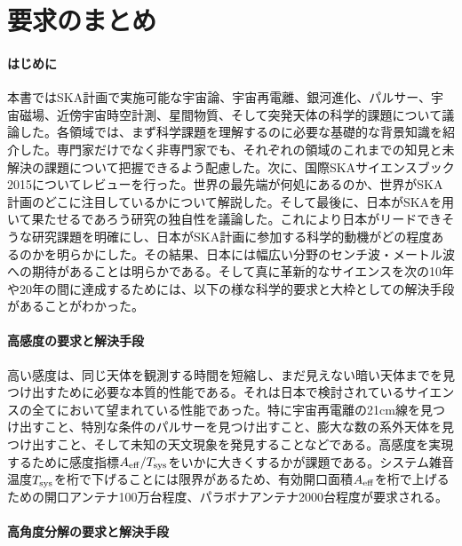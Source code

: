 \setcounter{section}{0}\section{要求のまとめ}
\label{c10.s1}

\paragraph{はじめに}

本書ではSKA計画で実施可能な宇宙論、宇宙再電離、銀河進化、パルサー、宇宙磁場、近傍宇宙時空計測、星間物質、そして突発天体の科学的課題について議論した。各領域では、まず科学課題を理解するのに必要な基礎的な背景知識を紹介した。専門家だけでなく非専門家でも、それぞれの領域のこれまでの知見と未解決の課題について把握できるよう配慮した。次に、国際SKAサイエンスブック2015についてレビューを行った。世界の最先端が何処にあるのか、世界がSKA計画のどこに注目しているかについて解説した。そして最後に、日本がSKAを用いて果たせるであろう研究の独自性を議論した。これにより日本がリードできそうな研究課題を明確にし、日本がSKA計画に参加する科学的動機がどの程度あるのかを明らかにした。その結果、日本には幅広い分野のセンチ波・メートル波への期待があることは明らかである。そして真に革新的なサイエンスを次の10年や20年の間に達成するためには、以下の様な科学的要求と大枠としての解決手段があることがわかった。

\paragraph{高感度の要求と解決手段}

高い感度は、同じ天体を観測する時間を短縮し、まだ見えない暗い天体までを見つけ出すために必要な本質的性能である。それは日本で検討されているサイエンスの全てにおいて望まれている性能であった。特に宇宙再電離の21cm線を見つけ出すこと、特別な条件のパルサーを見つけ出すこと、膨大な数の系外天体を見つけ出すこと、そして未知の天文現象を発見することなどである。高感度を実現するために感度指標$A_{\rm eff}/T_{\rm sys}$をいかに大きくするかが課題である。システム雑音温度$T_{\rm sys}$を桁で下げることには限界があるため、有効開口面積$A_{\rm eff}$を桁で上げるための開口アンテナ100万台程度、パラボナアンテナ2000台程度が要求される。

\paragraph{高角度分解の要求と解決手段}

